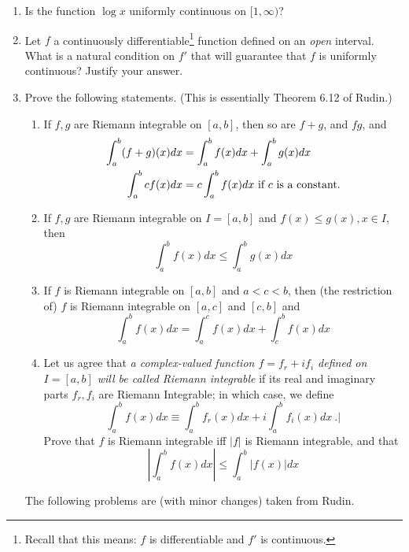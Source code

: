 \documentclass[11pt]{amsart}
\theoremstyle{definition}
\begin{document}
\begin{enumerate}[wide, labelwidth=!, labelindent=0pt]
\item Is the function $\log  x$ uniformly continuous on $[1,\infty)$? 

\item  Let $f$ a continuously differentiable\footnote{Recall that this means: $f$ is differentiable and $f'$ is continuous.} function defined on an \emph{open} interval.  What is a natural condition on $f'$ that will guarantee that $f$ is uniformly continuous? Justify your answer. 

\item Prove the following statements. (This is essentially Theorem 6.12 of Rudin.)

\begin{enumerate}[label=(\alph*)]
\item If $f,g$ are Riemann integrable on $[a,b]$, then so are $f+g$, and $fg$, and
\begin{equation*}
\begin{split}
\int_a^b (f+g)(x) dx&= \int_a^b f(x) dx +\int_a^b g(x) dx\\
\int_a^b cf(x) dx &= c\int_a^b f(x) dx\ \textup{if $c$ is a constant.}
\end{split}
\end{equation*}

\item If $f,g$ are Riemann integrable on $I = [a,b]$ and $f(x) \le g(x), x \in I$, then
\[
\int_a^b f(x) dx  \le \int_a^b g(x) dx
\]

\item If $f$ is Riemann integrable on $[a,b]$ and $a < c <b$, then (the restriction of)   $f$ is Riemann integrable on $[a,c]$ and $[c,b]$ and
\[
\int_a^b f(x) dx= \int_a^c f(x) dx+\int_c^b f(x) dx
\]

\item Let us agree that  \emph{a complex-valued function $f=f_r+if_i$ defined on $I=[a,b]$ will be called Riemann integrable} if its real and imaginary parts $f_r,f_i$ are Riemann Integrable; in which case, we define
\[
\int_a^b f(x) dx  \equiv  \int_a^b f_r(x) dx + i \int_a^b f_i(x) dx \ .|
\]
Prove that $f$ is Riemann integrable iff $|f|$ is Riemann integrable, and that
\[
|\int_a^b f(x) dx| \le \int_a^b |f(x)| dx
\]

\end{enumerate} 

The following problems are (with minor changes) taken from Rudin. 


\end{enumerate}
\end{document}
